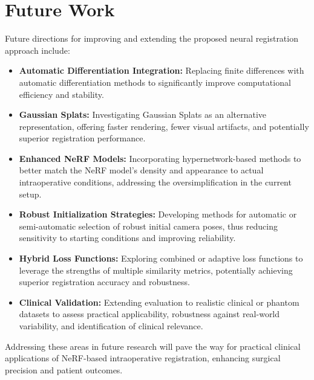 \section{Future Work}\label{sec:futurework}

Future directions for improving and extending the proposed neural registration approach include:

\begin{itemize}
    \item \textbf{Automatic Differentiation Integration:} Replacing finite differences with automatic differentiation methods to significantly improve computational efficiency and stability.

    \item \textbf{Gaussian Splats:} Investigating Gaussian Splats as an alternative representation, offering faster rendering, fewer visual artifacts, and potentially superior registration performance.

    \item \textbf{Enhanced NeRF Models:} Incorporating hypernetwork-based methods to better match the NeRF model's density and appearance to actual intraoperative conditions, addressing the oversimplification in the current setup.

    \item \textbf{Robust Initialization Strategies:} Developing methods for automatic or semi-automatic selection of robust initial camera poses, thus reducing sensitivity to starting conditions and improving reliability.

    \item \textbf{Hybrid Loss Functions:} Exploring combined or adaptive loss functions to leverage the strengths of multiple similarity metrics, potentially achieving superior registration accuracy and robustness.

    \item \textbf{Clinical Validation:} Extending evaluation to realistic clinical or phantom datasets to assess practical applicability, robustness against real-world variability, and identification of clinical relevance.
\end{itemize}

Addressing these areas in future research will pave the way for practical clinical applications of NeRF-based intraoperative registration, enhancing surgical precision and patient outcomes.
